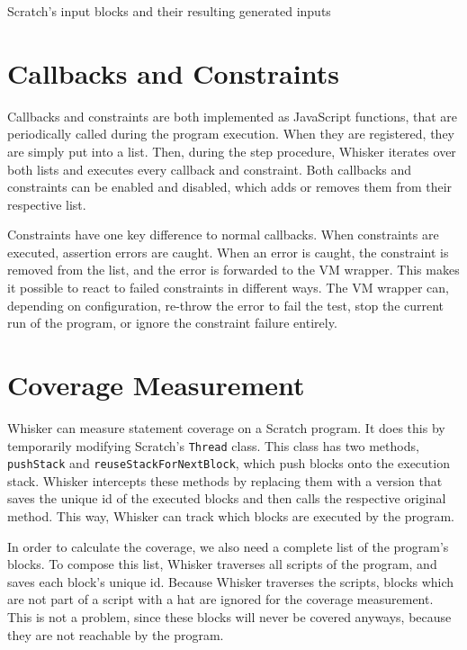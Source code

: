 \begin{table}[htpb]
    \caption{Scratch's input blocks and their resulting generated inputs}
    \label{tab:scratch_input_blocks}

    \renewcommand{\baselinestretch}{\oldbls}
\end{table}

\section{Callbacks and Constraints}
\label{sec:callbacks_and_constraints}

Callbacks and constraints are both implemented as JavaScript functions,
that are periodically called during the program execution.
When they are registered, they are simply put into a list.
Then, during the step procedure,
Whisker iterates over both lists and executes every callback and constraint.
Both callbacks and constraints can be enabled and disabled,
which adds or removes them from their respective list.
\parspace

Constraints have one key difference to normal callbacks.
When constraints are executed, assertion errors are caught.
When an error is caught, the constraint is removed from the list,
and the error is forwarded to the VM wrapper.
This makes it possible to react to failed constraints in different ways.
The VM wrapper can, depending on configuration, re-throw the error to fail the test,
stop the current run of the program,
or ignore the constraint failure entirely.

\section{Coverage Measurement}
\label{sec:coverage_measurement}


Whisker can measure statement coverage on a Scratch program.
It does this by temporarily modifying Scratch's \texttt{Thread} class.
This class has two methods, \texttt{pushStack} and \texttt{reuseStackForNextBlock},
which push blocks onto the execution stack.
Whisker intercepts these methods by replacing them with a version
that saves the unique id of the executed blocks and then calls the respective original method.
This way, Whisker can track which blocks are executed by the program.
\parspace

In order to calculate the coverage, we also need a complete list of the program's blocks.
To compose this list, Whisker traverses all scripts of the program,
and saves each block's unique id.
Because Whisker traverses the scripts, blocks which are not part of a script with a hat
are ignored for the coverage measurement.
This is not a problem, since these blocks will never be covered anyways,
because they are not reachable by the program.
\parspace

